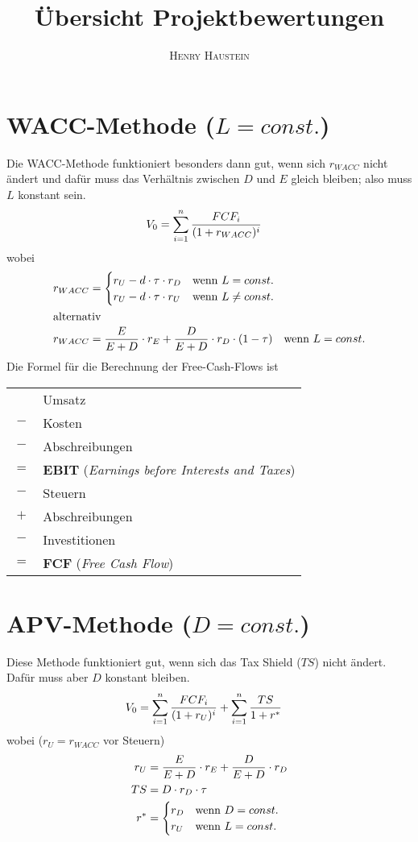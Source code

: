 \documentclass{article}
\title{\textbf{Übersicht Projektbewertungen}}
\author{\textsc{Henry Haustein}}
\date{}
\begin{document}
	\maketitle

	\section*{WACC-Methode ($L = const.$)}
	Die WACC-Methode funktioniert besonders dann gut, wenn sich $r_{WACC}$ nicht ändert und dafür muss das Verhältnis zwischen $D$ und $E$ gleich bleiben; also muss $L$ konstant sein.
	\begin{align}
		V_0 &= \sum_{i=1}^{n} \frac{FCF_i}{(1+r_{WACC})^i} \notag
	\end{align}
	wobei
	\begin{align}
		r_{WACC} &= \begin{cases}
			r_U - d\cdot\tau\cdot r_D &\text{wenn $L = const.$} \\
			r_U - d\cdot\tau\cdot r_U & \text{wenn $L \neq const.$}
		\end{cases} \notag \\
		\intertext{alternativ}
		r_{WACC} &= \frac{E}{E+D}\cdot r_E + \frac{D}{E+D}\cdot r_D\cdot (1-\tau) \quad\text{wenn $L = const.$} \notag
	\end{align}
	Die Formel für die Berechnung der Free-Cash-Flows ist
	\begin{center}
		\begin{tabular}{cl}
			& Umsatz \\
			$-$ & Kosten \\
			$-$ & Abschreibungen \\
			\hline
			$=$ & \textbf{EBIT} (\textit{Earnings before Interests and Taxes}) \\
			$-$ & Steuern \\
			$+$ & Abschreibungen \\
			$-$ & Investitionen \\
			\hline
			$=$ & \textbf{FCF} (\textit{Free Cash Flow})
		\end{tabular}
	\end{center}

	\section*{APV-Methode ($D=const.$)}
	Diese Methode funktioniert gut, wenn sich das Tax Shield ($TS$) nicht ändert. Dafür muss aber $D$ konstant bleiben.
	\begin{align}
		V_0 &= \sum_{i=1}^{n} \frac{FCF_i}{(1+r_U)^i} + \sum_{i=1}^n \frac{TS}{1+r^\ast} \notag
	\end{align}
	wobei ($r_U = r_{WACC}$ vor Steuern)
	\begin{align}
		r_U &= \frac{E}{E+D}\cdot r_E + \frac{D}{E+D}\cdot r_D \notag \\
		TS &= D \cdot r_D\cdot \tau \notag \\
		r^\ast &= \begin{cases}
			r_D & \text{wenn $D=const.$} \\
			r_U & \text{wenn $L=const.$}
		\end{cases} \notag
	\end{align}
\end{document}
